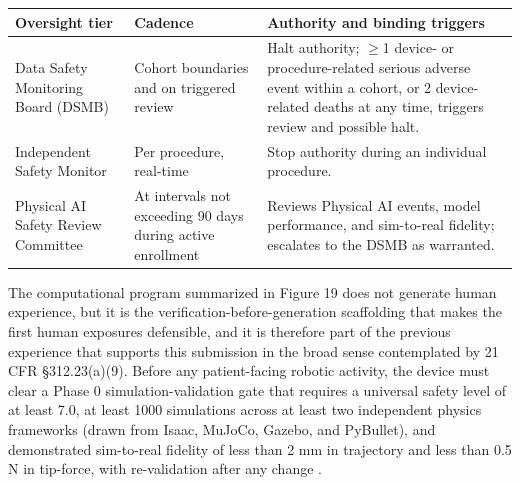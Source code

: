 \clearpage

\noindent\begin{tabularx}{\textwidth}{L{3cm} L{4cm} Y}
\toprule
\textbf{Oversight tier} & \textbf{Cadence} & \textbf{Authority and binding triggers} \\
\midrule
Data Safety Monitoring Board (DSMB) & Cohort boundaries and on triggered review & Halt authority; $\geq$1 device- or procedure-related serious adverse event within a cohort, or 2 device-related deaths at any time, triggers review and possible halt. \\
Independent Safety Monitor & Per procedure, real-time & Stop authority during an individual procedure. \\
Physical AI Safety Review Committee & At intervals not exceeding 90 days during active enrollment & Reviews Physical AI events, model performance, and sim-to-real fidelity; escalates to the DSMB as warranted. \\
\bottomrule
\end{tabularx}
\vspace*{-0.3cm}

The computational program summarized in Figure 19 does not generate human
experience, but it is the verification-before-generation scaffolding that makes the
first human exposures defensible, and it is therefore part of the previous
experience that supports this submission in the broad sense contemplated by 21 CFR
\S 312.23(a)(9). Before any patient-facing robotic activity, the device must clear
a Phase 0 simulation-validation gate that requires a universal safety level of at
least 7.0, at least 1000 simulations across at least two independent physics
frameworks (drawn from Isaac, MuJoCo, Gazebo, and PyBullet), and demonstrated
sim-to-real fidelity of less than 2 mm in trajectory and less than 0.5 N in
tip-force, with re-validation after any change \cite{fdadigtwinpc, qspmetpancre}.


